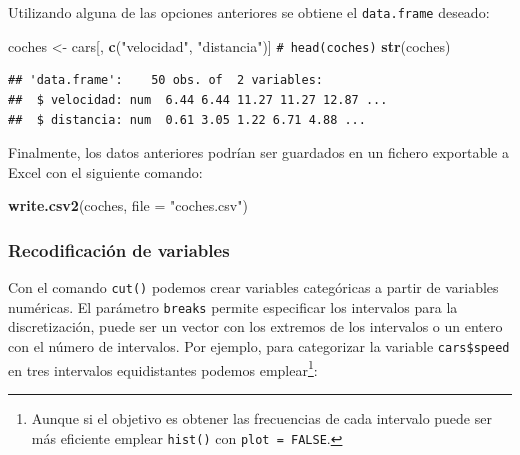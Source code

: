 \documentclass[
]{book}
\newenvironment{Shaded}{\begin{snugshade}}{\end{snugshade}}
\newcommand{\AttributeTok}[1]{\textcolor[rgb]{0.13,0.29,0.53}{#1}}
\newcommand{\CommentTok}[1]{\textcolor[rgb]{0.56,0.35,0.01}{\textit{#1}}}
\newcommand{\DecValTok}[1]{\textcolor[rgb]{0.00,0.00,0.81}{#1}}
\newcommand{\FunctionTok}[1]{\textcolor[rgb]{0.13,0.29,0.53}{\textbf{#1}}}
\newcommand{\NormalTok}[1]{#1}
\newcommand{\OtherTok}[1]{\textcolor[rgb]{0.56,0.35,0.01}{#1}}
\newcommand{\SpecialCharTok}[1]{\textcolor[rgb]{0.81,0.36,0.00}{\textbf{#1}}}
\newcommand{\StringTok}[1]{\textcolor[rgb]{0.31,0.60,0.02}{#1}}
\theoremstyle{break}
\theoremstyle{nonumberplain}
\renewcommand{\CommentTok}[1]{\textcolor[rgb]{0.41,0.41,0.41}{\texttt{#1}}}
\let\oldfootnote\footnote
\renewcommand\footnote[1]{\oldfootnote{\hspace{2mm}#1}}
\begin{document}
Utilizando alguna de las opciones anteriores se obtiene el \texttt{data.frame}
deseado:

\begin{Shaded}
\begin{Highlighting}[]
\NormalTok{coches }\OtherTok{\textless{}{-}}\NormalTok{ cars[, }\FunctionTok{c}\NormalTok{(}\StringTok{"velocidad"}\NormalTok{, }\StringTok{"distancia"}\NormalTok{)]}
\CommentTok{\# head(coches)}
\FunctionTok{str}\NormalTok{(coches)}
\end{Highlighting}
\end{Shaded}

\begin{verbatim}
## 'data.frame':    50 obs. of  2 variables:
##  $ velocidad: num  6.44 6.44 11.27 11.27 12.87 ...
##  $ distancia: num  0.61 3.05 1.22 6.71 4.88 ...
\end{verbatim}

Finalmente, los datos anteriores podrían ser guardados en un fichero
exportable a Excel con el siguiente comando:

\begin{Shaded}
\begin{Highlighting}[]
\FunctionTok{write.csv2}\NormalTok{(coches, }\AttributeTok{file =} \StringTok{"coches.csv"}\NormalTok{)}
\end{Highlighting}
\end{Shaded}

\subsubsection{Recodificación de variables}\label{recodificaciuxf3n-de-variables}

Con el comando \texttt{cut()} podemos crear variables categóricas a partir de variables numéricas.
El parámetro \texttt{breaks} permite especificar los intervalos para la discretización, puede ser un vector con los extremos de los intervalos o un entero con el número de intervalos.
Por ejemplo, para categorizar la variable \texttt{cars\$speed} en tres intervalos equidistantes podemos emplear\footnote{Aunque si el objetivo es obtener las frecuencias de cada intervalo puede ser más eficiente emplear \texttt{hist()} con \texttt{plot\ =\ FALSE}.}:

\begin{Shaded}
\end{Shaded}
\end{document}
